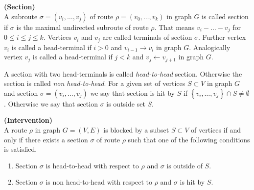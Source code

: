 \begin{defi} {\textbf{(Section)}} \\
	A subroute $\sigma = (v_i, \dots, v_j)$ of route $\rho = (v_0, \dots, v_k)$ in graph $G$ is called section if $			\sigma$ is the maximal undirected subroute of route $\rho$. That means $v_i - \dots - v_j$ for $0 \le i \le j 			\le k$. Vertices $v_i$ and $v_j$ are called terminals of section $\sigma$. Further vertex $v_i$ is called a 			head-terminal if $i>0$ and $v_{i-1} \rightarrow v_i$ in graph $G$. Analogically vertex $v_j$ is called 
	a head-terminal if $j<k$ and $v_j \leftarrow v_{j+1}$ in graph $G$.
\end{defi}


A section with two head-terminals is called \textit{head-to-head} section. Otherwise the section is called 
\textit{non head-to-head}. For a given set of vertices $S \subset V$ in graph $G$ and section $\sigma = (v_i, \dots, v_j)$ we say that section is hit by $S$ if $\left\lbrace v_i , \dots, v_j \right\rbrace \cap S \neq \emptyset$. Otherwise we say that section $\sigma$ is outside set $S$.



\begin{defi} {\textbf{(Intervention)}} \\
	A route $\rho$ in graph $G = (V, E)$ is blocked by a subset $S \subset V$ of vertices if and only if there 				exists a section $\sigma$ of route $\rho$ such that one of the following conditions is satisfied.
	
	\begin{enumerate}
		\item Section $\sigma$ is head-to-head with respect to $\rho$ and $\sigma$ is outside of $S$.
		\item Section $\sigma$ is non head-to-head with respect to $\rho$ and $\sigma$ is hit by $S$.
	\end{enumerate}
	
\end{defi}



